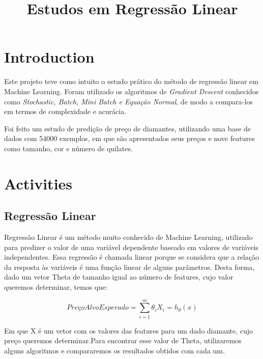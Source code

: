 \documentclass[conference]{IEEEtran}
\begin{document}
\title{Estudos em Regressão Linear}

\author{
\and
{}
}

\maketitle

\section{Introduction}

Este projeto teve como intuito o estudo prático do método de regressão linear em Machine Learning. Foram utilizado os algoritmos de \textit{Gradient Descent} conhecidos como \textit{Stochastic, Batch, Mini Batch e Equação Normal}, de modo a compara-los em termos de complexidade e acurácia.

Foi feito um estudo de predição de preço de diamantes, utilizando uma base de dados com 54000 exemplos, em que são apresentados seus preços e nove features como tamanho, cor e número de quilates.

\section{Activities}

\subsection{Regressão Linear}

Regressão Linear é um método muito conhecido de Machine Learning, utilizado para predizer o valor de uma variável dependente baseado em valores de variáveis independentes. Essa regressão é chamada linear porque se considera que a relação da resposta às variáveis é uma função linear de alguns parâmetros. Desta forma, dado um vetor Theta de tamanho igual ao número de features, cujo valor queremos determinar, temos que:

\begin{equation} \label{eq:hx}
PreçoAlvoEsperado = \sum_{i=1}^{m} \theta_{i}X_{i} = h_{\theta}(x)
\end{equation}

Em que X é um vetor com os valores das features para um dado diamante, cujo preço queremos determinar.Para encontrar esse valor de Theta, utilizaremos alguns algoritmos e compararemos os resultados obtidos com cada um.
\end{document}

